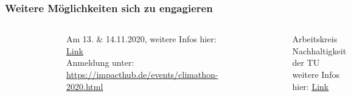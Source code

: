 \iffalse
\begin{frame}
  \frametitle{Weitere Möglichkeiten sich zu engagieren}
  \begin{columns}
    \begin{figure}
      \centering
      \includegraphics[width=\textwidth]{bilder/climate-kic-logo.pdf}
    \end{figure}
    Am 13. \& 14.11.2020, weitere Infos hier: \href{https://cet.tu-dortmund.de/veranstaltungen/detail/climathon-germany-4770/}{\color{blue}\underline{Link}}\\
    Anmeldung unter:\\
    \url{https://impacthub.de/events/climathon-2020.html}
    \begin{figure}
      \centering
      \includegraphics[width=\textwidth]{bilder/akn-tu.jpg}
    \end{figure}
    Arbeitskreis Nachhaltigkeit der TU\\
    weitere Infos hier: \href{https://www.tu-dortmund.de/universitaet/nachhaltigkeit/}{\color{blue}\underline{Link}}
  \end{columns}


\end{frame}
